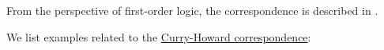 \begin{comments}
  \item From the perspective of first-order logic, the correspondence is described in .
\end{comments}

\begin{example}\label{ex:con:curry_howard_correspondence}
  We list examples related to the \hyperref[con:curry_howard_correspondence]{Curry-Howard correspondence}:
  \begin{thmenum}
  \end{thmenum}
\end{example}
